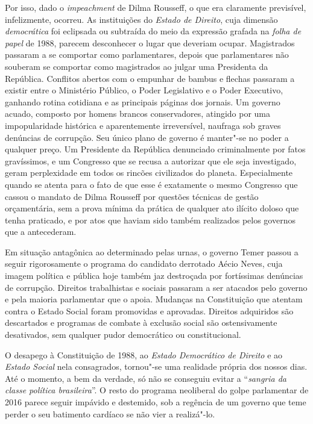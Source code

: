 Por isso, dado o \emph{impeachment} de Dilma Rousseff, o que era
claramente previsível, infelizmente, ocorreu. As instituições do
\emph{Estado de Direito}, cuja dimensão \emph{democrática} foi eclipsada
ou subtraída do meio da expressão grafada na \emph{folha de papel} de
1988, parecem desconhecer o lugar que deveriam ocupar. Magistrados
passaram a se comportar como parlamentares, depois que parlamentares não
souberam se comportar como magistrados ao julgar uma Presidenta da
República. Conflitos abertos com o empunhar de bambus e flechas passaram
a existir entre o Ministério Público, o Poder Legislativo e o Poder
Executivo, ganhando rotina cotidiana e as principais páginas dos
jornais. Um governo acuado, composto por homens brancos conservadores,
atingido por uma impopularidade histórica e aparentemente irreversível,
naufraga sob graves denúncias de corrupção. Seu único plano de governo é
manter"-se no poder a qualquer preço. Um Presidente da República
denunciado criminalmente por fatos gravíssimos, e um Congresso que se
recusa a autorizar que ele seja investigado, geram perplexidade em todos
os rincões civilizados do planeta. Especialmente quando se atenta para o
fato de que esse é exatamente o mesmo Congresso que cassou o mandato de
Dilma Rousseff por questões técnicas de gestão orçamentária, sem a prova
mínima da prática de qualquer ato ilícito doloso que tenha praticado, e
por atos que haviam sido também realizados pelos governos que a
antecederam.

Em situação antagônica ao determinado pelas urnas, o governo Temer
passou a seguir rigorosamente o programa do candidato derrotado Aécio
Neves, cuja imagem política e pública hoje também jaz destroçada por
fortíssimas denúncias de corrupção. Direitos trabalhistas e sociais
passaram a ser atacados pelo governo e pela maioria parlamentar que o
apoia. Mudanças na Constituição que atentam contra o Estado Social foram
promovidas e aprovadas. Direitos adquiridos são descartados e programas
de combate à exclusão social são ostensivamente desativados, sem
qualquer pudor democrático ou constitucional.

O desapego à Constituição de 1988, ao \emph{Estado Democrático de
Direito} e ao \emph{Estado Social} nela consagrados, tornou"-se uma
realidade própria dos nossos dias. Até o momento, a bem da verdade, só
não se conseguiu evitar a ``\emph{sangria da classe política
brasileira}''. O resto do programa neoliberal do golpe parlamentar de
2016 parece seguir impávido e destemido, sob a regência de um governo
que teme perder o seu batimento cardíaco se não vier a realizá"-lo.

